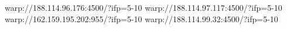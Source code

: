 warp://188.114.96.176:4500/?ifp=5-10
warp://188.114.97.117:4500/?ifp=5-10
warp://162.159.195.202:955/?ifp=5-10
warp://188.114.99.32:4500/?ifp=5-10
